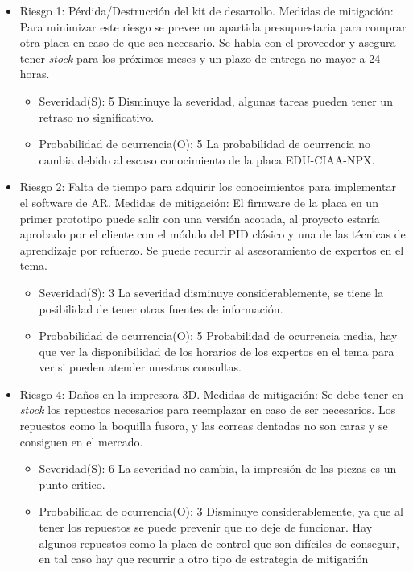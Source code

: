 \documentclass[11pt]{charter}
\begin{document}
\begin{itemize}
\item Riesgo 1: Pérdida/Destrucción	del kit de desarrollo.
	Medidas de mitigación: Para minimizar este riesgo se prevee un apartida presupuestaria para comprar otra placa en caso de que sea necesario. Se habla con el proveedor y asegura tener \textit{stock} para los próximos meses y un plazo de entrega no mayor a 24 horas.
	\begin{itemize}
	\item Severidad(S): 5 Disminuye la severidad, algunas tareas pueden tener un retraso no significativo. 
	\item  Probabilidad de ocurrencia(O): 5 La probabilidad de ocurrencia no cambia debido al escaso conocimiento de la placa EDU-CIAA-NPX. 
	\end{itemize}
\item Riesgo 2:  Falta de tiempo para adquirir los conocimientos
para implementar el software de AR.
	Medidas de mitigación: El firmware de la placa en un primer prototipo puede salir con una versión acotada, al proyecto estaría aprobado por el cliente con el módulo del PID clásico y una de las técnicas de aprendizaje por refuerzo. Se puede recurrir al asesoramiento de expertos en el tema.
	\begin{itemize}
	\item Severidad(S): 3 La severidad disminuye considerablemente, se tiene la posibilidad de tener otras fuentes de información.
	\item  Probabilidad de ocurrencia(O): 5 Probabilidad de ocurrencia media, hay que ver la disponibilidad de los horarios de los expertos en el tema para ver si pueden atender nuestras consultas.  
	\end{itemize} 
\item Riesgo 4: Daños en la	impresora 3D.
	Medidas de mitigación: Se debe tener en \textit{stock} los repuestos necesarios para reemplazar en caso de ser necesarios. Los repuestos como la boquilla fusora, y las correas dentadas no son caras y se consiguen en el mercado.
	\begin{itemize}
	\item Severidad(S): 6 La severidad no cambia, la impresión de las piezas es un punto critico.
	\item  Probabilidad de ocurrencia(O): 3 Disminuye considerablemente, ya que al tener los repuestos se puede prevenir que no deje de funcionar. Hay algunos repuestos como la placa de control que son difíciles de conseguir, en tal caso hay que recurrir a otro tipo de estrategia de mitigación

\end{itemize}
\end{itemize}
\end{document}
